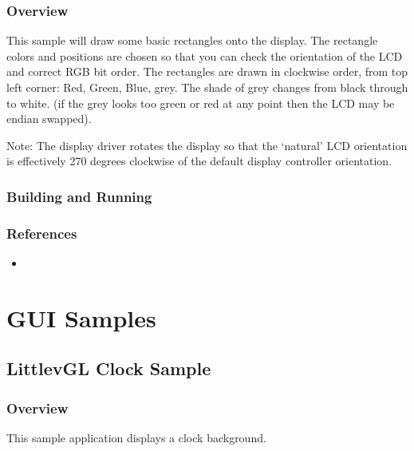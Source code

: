 \documentclass[letterpaper,10pt,english]{sphinxmanual}
\begin{document}
\subsubsection{Overview}
\label{\detokenize{samples/display/st7789v/README:overview}}
This sample will draw some basic rectangles onto the display.
The rectangle colors and positions are chosen so that you can check the
orientation of the LCD and correct RGB bit order. The rectangles are drawn
in clockwise order, from top left corner: Red, Green, Blue, grey. The shade of
grey changes from black through to white. (if the grey looks too green or red
at any point then the LCD may be endian swapped).

Note: The display driver rotates the display so that the ‘natural’ LCD
orientation is effectively 270 degrees clockwise of the default display
controller orientation.


\subsubsection{Building and Running}
\label{\detokenize{samples/display/st7789v/README:building-and-running}}

\subsubsection{References}
\label{\detokenize{samples/display/st7789v/README:references}}\begin{itemize}
\item {} 

\end{itemize}


\section{GUI Samples}
\label{\detokenize{samples/gui/gui:gui-samples}}\label{\detokenize{samples/gui/gui:id1}}\label{\detokenize{samples/gui/gui::doc}}

\subsection{LittlevGL Clock Sample}
\label{\detokenize{samples/gui/clock/README:littlevgl-clock-sample}}\label{\detokenize{samples/gui/clock/README:clock-sample}}\label{\detokenize{samples/gui/clock/README::doc}}

\subsubsection{Overview}
\label{\detokenize{samples/gui/clock/README:overview}}
This sample application displays a clock background.
\end{document}
